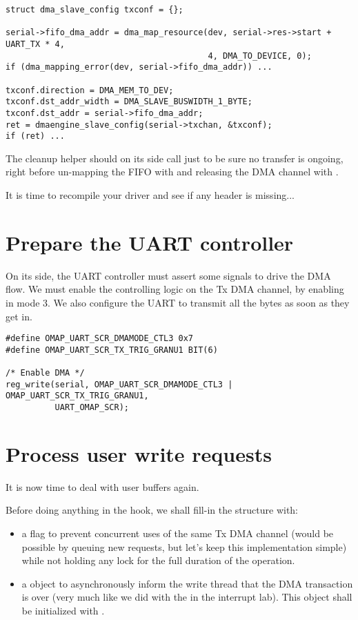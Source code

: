 \begin{verbatim}
struct dma_slave_config txconf = {};

serial->fifo_dma_addr = dma_map_resource(dev, serial->res->start + UART_TX * 4,
                                         4, DMA_TO_DEVICE, 0);
if (dma_mapping_error(dev, serial->fifo_dma_addr)) ...

txconf.direction = DMA_MEM_TO_DEV;
txconf.dst_addr_width = DMA_SLAVE_BUSWIDTH_1_BYTE;
txconf.dst_addr = serial->fifo_dma_addr;
ret = dmaengine_slave_config(serial->txchan, &txconf);
if (ret) ...
\end{verbatim}

The cleanup helper should on its side call
 just to be sure no transfer is
ongoing, right before un-mapping the FIFO with  and
releasing the DMA channel with .

It is time to recompile your driver and see if any header is missing...

\section{Prepare the UART controller}

On its side, the UART controller must assert some signals to drive the DMA
flow. We must enable the controlling logic on the Tx DMA channel, by enabling
 in mode 3. We also configure the UART to transmit all the bytes
as soon as they get in.

\begin{verbatim}
#define OMAP_UART_SCR_DMAMODE_CTL3 0x7
#define OMAP_UART_SCR_TX_TRIG_GRANU1 BIT(6)

/* Enable DMA */
reg_write(serial, OMAP_UART_SCR_DMAMODE_CTL3 | OMAP_UART_SCR_TX_TRIG_GRANU1,
          UART_OMAP_SCR);
\end{verbatim}

\section{Process user write requests}

It is now time to deal with user buffers again.

Before doing anything in the  hook, we shall fill-in the
 structure with:
\begin{itemize}
\item a  flag to prevent concurrent uses of the same
  Tx DMA channel (would be possible by queuing new requests, but let's keep this
  implementation simple) while not holding any lock for the full duration of
  the operation.
\item a  object to asynchronously inform the
  write thread that the DMA transaction is over (very much like we did with the
   in the interrupt lab). This object shall be initialized with
  .
\end{itemize}

